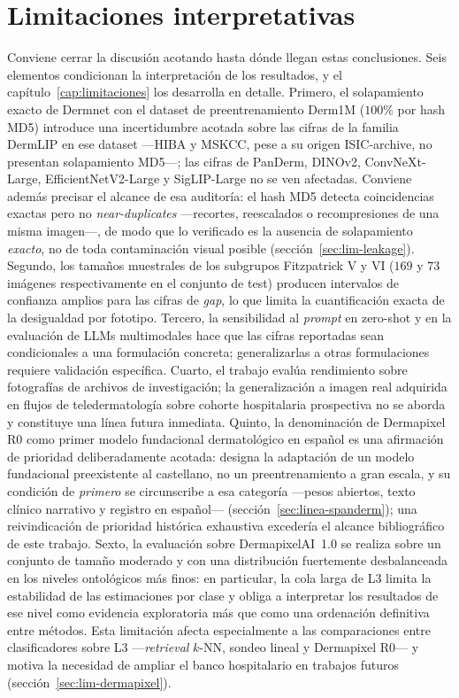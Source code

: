 \section{Limitaciones interpretativas}
\label{sec:disc-limitaciones}

Conviene cerrar la discusión acotando hasta dónde llegan estas
conclusiones. Seis elementos condicionan la interpretación de los
resultados, y el capítulo~\ref{cap:limitaciones} los desarrolla en
detalle. Primero, el solapamiento exacto de Dermnet con el dataset de
preentrenamiento Derm1M ($100\%$ por hash MD5) introduce una
incertidumbre acotada sobre las cifras de la familia DermLIP en ese
dataset ---HIBA y MSKCC, pese a su origen ISIC-archive, no presentan
solapamiento MD5---; las cifras de PanDerm, DINOv2, ConvNeXt-Large,
EfficientNetV2-Large y SigLIP-Large no se ven afectadas. Conviene
además precisar el alcance de esa auditoría: el hash MD5 detecta
coincidencias exactas pero no \emph{near-duplicates} ---recortes,
reescalados o recompresiones de una misma imagen---, de modo que lo
verificado es la ausencia de solapamiento \emph{exacto}, no de toda
contaminación visual posible (sección~\ref{sec:lim-leakage}). Segundo, los
tamaños muestrales de los subgrupos Fitzpatrick V y VI ($169$ y
$73$ imágenes respectivamente en el conjunto de test) producen
intervalos de confianza amplios para las cifras de \emph{gap}, lo que
limita la cuantificación exacta de la desigualdad por fototipo.
Tercero, la sensibilidad al \emph{prompt} en zero-shot y en la
evaluación de LLMs multimodales hace que las cifras reportadas sean
condicionales a una formulación concreta; generalizarlas a otras
formulaciones requiere validación específica. Cuarto, el trabajo
evalúa rendimiento sobre fotografías de archivos de investigación; la
generalización a imagen real adquirida en flujos de teledermatología
sobre cohorte hospitalaria prospectiva no se aborda y constituye una
línea futura inmediata. Quinto, la denominación de Dermapixel R0 como
primer modelo fundacional dermatológico en español es una afirmación
de prioridad deliberadamente acotada: designa la adaptación de un
modelo fundacional preexistente al castellano, no un preentrenamiento
a gran escala, y su condición de \emph{primero} se circunscribe a esa
categoría ---pesos abiertos, texto clínico narrativo y registro en
español--- (sección~\ref{sec:linea-spanderm}); una reivindicación de
prioridad histórica exhaustiva excedería el alcance bibliográfico de
este trabajo. Sexto, la evaluación sobre DermapixelAI~1.0 se realiza
sobre un conjunto de tamaño moderado y con una distribución fuertemente
desbalanceada en los niveles ontológicos más finos: en particular, la
cola larga de L3 limita la estabilidad de las estimaciones por clase y
obliga a interpretar los resultados de ese nivel como evidencia
exploratoria más que como una ordenación definitiva entre métodos. Esta
limitación afecta especialmente a las comparaciones entre clasificadores
sobre L3 ---\emph{retrieval} $k$-NN, sondeo lineal y Dermapixel R0--- y
motiva la necesidad de ampliar el banco hospitalario en trabajos futuros
(sección~\ref{sec:lim-dermapixel}).

